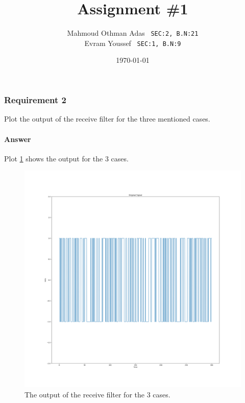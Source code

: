 \documentclass[
	12pt, %
	oneside
]{fphw}
\title{Assignment \#1} %
\author{Mahmoud Othman Adas ~\small{\texttt{SEC:2, B.N:21}} \\ 
Evram Youssef ~\small{\texttt{SEC:1, B.N:9}}} %
\date{\today} %
\institute{Cairo University \\ Computer Engineering} %
\begin{document}
\maketitle %

\setcounter{part}{1}
\part{}

\section*{Requirement 2}
\begin{problem}
	Plot the output of the receive filter for the three mentioned cases.
\end{problem}

\subsection*{Answer} 
Plot \ref{plot:orig} shows the output for the 3 cases.

\begin{figure}
	\centering
	\includegraphics[width=15cm]{../graphs/orig}
	\caption{The output of the receive filter for the 3 cases.}
	\label{plot:orig}
\end{figure}
\clearpage
\end{document}
